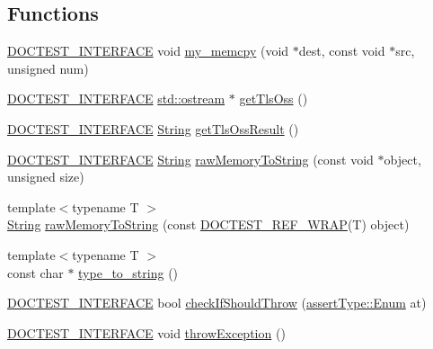 \subsection*{Functions}
\begin{DoxyCompactItemize}
\item 
\hyperlink{doctest_8h_a9c16ffc635ec47f07797d21ede26b1a5}{D\+O\+C\+T\+E\+S\+T\+\_\+\+I\+N\+T\+E\+R\+F\+A\+CE} void \hyperlink{namespacedoctest_1_1detail_a4027cb5407ce2ff132645e89bba97010}{my\+\_\+memcpy} (void $\ast$dest, const void $\ast$src, unsigned num)
\item 
\hyperlink{doctest_8h_a9c16ffc635ec47f07797d21ede26b1a5}{D\+O\+C\+T\+E\+S\+T\+\_\+\+I\+N\+T\+E\+R\+F\+A\+CE} \hyperlink{doctest_8h_a116af65cb5e924b33ad9d9ecd7a783f3}{std\+::ostream} $\ast$ \hyperlink{namespacedoctest_1_1detail_a52299f4a981a01a3d3fe6e8d7518823d}{get\+Tls\+Oss} ()
\item 
\hyperlink{doctest_8h_a9c16ffc635ec47f07797d21ede26b1a5}{D\+O\+C\+T\+E\+S\+T\+\_\+\+I\+N\+T\+E\+R\+F\+A\+CE} \hyperlink{classdoctest_1_1String}{String} \hyperlink{namespacedoctest_1_1detail_a7b0b3df5fe79d7ffa8fa138201476df1}{get\+Tls\+Oss\+Result} ()
\item 
\hyperlink{doctest_8h_a9c16ffc635ec47f07797d21ede26b1a5}{D\+O\+C\+T\+E\+S\+T\+\_\+\+I\+N\+T\+E\+R\+F\+A\+CE} \hyperlink{classdoctest_1_1String}{String} \hyperlink{namespacedoctest_1_1detail_adb894f73b88fb3b39d6c48d80451f5ff}{raw\+Memory\+To\+String} (const void $\ast$object, unsigned size)
\item 
{\footnotesize template$<$typename T $>$ }\\\hyperlink{classdoctest_1_1String}{String} \hyperlink{namespacedoctest_1_1detail_a28da75fd01ab3d943436aa69876b7151}{raw\+Memory\+To\+String} (const \hyperlink{doctest_8h_af2901cafb023c57fb672ccb1bf14f2eb}{D\+O\+C\+T\+E\+S\+T\+\_\+\+R\+E\+F\+\_\+\+W\+R\+AP}(T) object)
\item 
{\footnotesize template$<$typename T $>$ }\\const char $\ast$ \hyperlink{namespacedoctest_1_1detail_a8ad4f98867561d1ca7865874a2f82d7e}{type\+\_\+to\+\_\+string} ()
\item 
\hyperlink{doctest_8h_a9c16ffc635ec47f07797d21ede26b1a5}{D\+O\+C\+T\+E\+S\+T\+\_\+\+I\+N\+T\+E\+R\+F\+A\+CE} bool \hyperlink{namespacedoctest_1_1detail_acec9ff072dd86af95225a8beb9c57298}{check\+If\+Should\+Throw} (\hyperlink{namespacedoctest_1_1assertType_ae1bb5bed722f34f1c38b83cb19d326d3}{assert\+Type\+::\+Enum} at)
\item 
\hyperlink{doctest_8h_a9c16ffc635ec47f07797d21ede26b1a5}{D\+O\+C\+T\+E\+S\+T\+\_\+\+I\+N\+T\+E\+R\+F\+A\+CE} void \hyperlink{namespacedoctest_1_1detail_a60ffd50b9ee7adfcafc078f333aac8b6}{throw\+Exception} ()

\end{DoxyCompactItemize}
